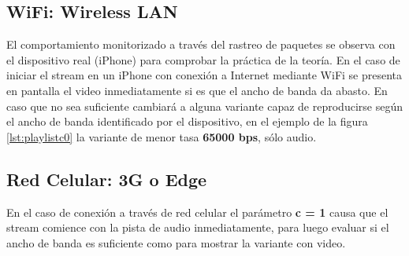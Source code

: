   \subsection{WiFi: Wireless LAN}
  El comportamiento monitorizado a través del rastreo de paquetes se observa con el dispositivo real (iPhone) para comprobar la práctica de la teoría.
  En el caso de iniciar el stream en un iPhone con conexión a Internet mediante WiFi se presenta en pantalla el video inmediatamente si es que el ancho de banda da abasto. En caso que no sea suficiente cambiará a alguna variante capaz de reproducirse según el ancho de banda identificado por el dispositivo, en el ejemplo de la figura \ref{lst:playlistc0} la variante de menor tasa \textbf{65000 bps}, sólo audio.
  
  
  

  \subsection{Red Celular: 3G o Edge}
En el caso de conexión a través de red celular el parámetro \textbf{c = 1} causa que el stream comience con la pista de audio inmediatamente, para luego evaluar si el ancho de banda es suficiente como para mostrar la variante con video.

